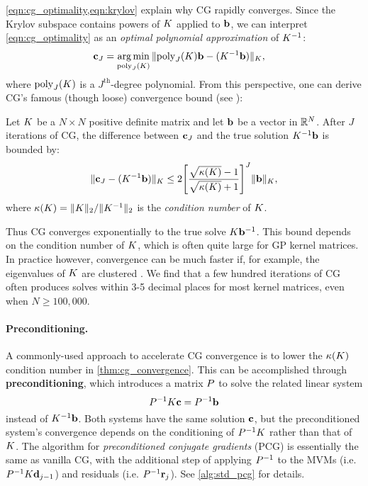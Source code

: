 \cref{eqn:cg_optimality,eqn:krylov} explain why CG rapidly converges.
Since the Krylov subspace contains powers of $K$ applied to $\mathbf{b}$, we can interpret \cref{eqn:cg_optimality} as an \emph{optimal polynomial approximation} of $K^{-1}$:
%
\begin{align*}
  \mathbf{c}_J &= \operatorname*{arg\,min}_{\text{poly}_J(K)} \Vert \text{poly}_J(K)\mathbf{b} - (K^{-1} \mathbf{b}) \Vert_{K},
\end{align*}
%
where $\text{poly}_J(K)$ is a $J^\text{th}$-degree polynomial.
From this perspective, one can derive CG's famous (though loose) convergence bound (see \citep[e.g.][Ch. 9]{shewchuk1994introduction}):
%
\begin{theorem}[Convergence of CG]
  \label{thm:cg_convergence}
  Let $K$ be a $N \times N$ positive definite matrix and let $\mathbf{b}$ be a vector in $\mathbb{R}^N$.
  After $J$ iterations of CG, the difference between $\mathbf{c}_J$ and the true solution $K^{-1} \mathbf{b}$ is bounded by:
  \begin{equation*}
    \Vert \mathbf{c}_J - (K^{-1} \mathbf{b}) \Vert_{K}
    \leq
    2 \Bigg[ \frac{ \sqrt{ \kappa(K) } - 1 }{\sqrt{ \kappa(K) } + 1} \Biggr]^J \Vert \mathbf{b} \Vert_{K},
  \end{equation*}
  where $\kappa(K) = \Vert K \Vert_2 / \Vert K^{-1} \Vert_2$ is the \emph{condition number} of $K$.
\end{theorem}
%
\noindent
Thus CG converges exponentially to the true solve $K \mathbf{b}^{-1}$.
This bound depends on the condition number of $K$, which is often quite large for GP kernel matrices.
In practice however, convergence can be much faster if, for example, the eigenvalues of $K$ are clustered \cite{saad2003iterative}.
We find that a few hundred iterations of CG often produces solves within 3-5 decimal places for most kernel matrices, even when $N \geq 100,\!000$.

\paragraph{Preconditioning.}
A commonly-used approach to accelerate CG convergence is to lower the $\kappa(K)$ condition number in \cref{thm:cg_convergence}.
This can be accomplished through {\bf preconditioning}, which introduces a matrix $P$ to solve the related linear system
%
\[
  P^{-1} K \mathbf{c} = P^{-1} \mathbf{b}
\]
%
instead of $K^{-1} \mathbf{b}$.
Both systems have the same solution $\mathbf{c}$, but the preconditioned system's convergence depends on the conditioning of $P^{-1} K$ rather than that of $K$.
The algorithm for \emph{preconditioned conjugate gradients} (PCG) is essentially the same as vanilla CG, with the additional step of applying $P^{-1}$ to the MVMs (i.e. $P^{-1} K \mathbf{d}_{j-1}$) and residuals (i.e. $P^{-1} \mathbf{r}_j$).
See \cref{alg:std_pcg} for details.

